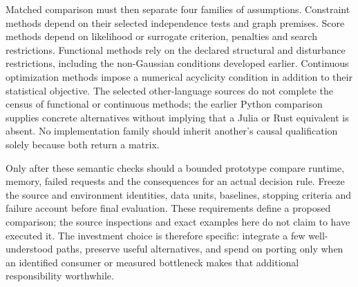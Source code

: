 Matched comparison must then separate four families of assumptions.
Constraint methods depend on their selected independence tests and graph
premises. Score methods depend on likelihood or surrogate criterion,
penalties and search restrictions. Functional methods rely on the declared
structural and disturbance restrictions, including the non-Gaussian
conditions developed earlier. Continuous optimization methods impose a
numerical acyclicity condition in addition to their statistical objective.
The selected other-language sources do not complete the census of
functional or continuous methods; the earlier Python comparison supplies
concrete alternatives without implying that a Julia or Rust equivalent is
absent. No implementation family should inherit another's causal
qualification solely because both return a matrix.

Only after these semantic checks should a bounded prototype compare runtime,
memory, failed requests and the consequences for an actual decision rule.
Freeze the source and environment identities, data units, baselines,
stopping criteria and failure account before final evaluation. These
requirements define a proposed comparison; the source inspections and exact
examples here do not claim to have executed it. The investment choice is
therefore specific: integrate a few well-understood paths, preserve useful
alternatives, and spend on porting only when an identified consumer or
measured bottleneck makes that additional responsibility worthwhile.
\label{exec13:other-discovery-end}
